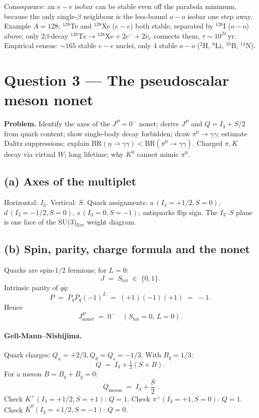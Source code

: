 \documentclass[11pt]{article}
\begin{document}
Consequence: an $e\!-\!e$ isobar can be stable even off the parabola minimum, because the only single-$\beta$ neighbour is the less-bound $o\!-\!o$ isobar one step away. Example $A=128$: $^{128}$Te and $^{128}$Xe ($e\!-\!e$) both stable, separated by $^{128}$I ($o\!-\!o$) above; only $2\beta$-decay $^{128}\text{Te}\to{}^{128}\text{Xe}+2e^{-}+2\bar\nu_{e}$ connects them, $\tau\sim 10^{24}\,$yr. Empirical census: $\sim 165$ stable $e\!-\!e$ nuclei, only 4 stable $o\!-\!o$ ($^{2}$H, $^{6}$Li, $^{10}$B, $^{14}$N).

\section*{Question 3 --- The pseudoscalar meson nonet}

\textbf{Problem.} Identify the axes of the $J^{P}=0^{-}$ nonet; derive $J^{P}$ and $Q=I_{3}+S/2$ from quark content; show single-body decay forbidden; draw $\pi^{0}\to\gamma\gamma$; estimate Dalitz suppressions; explain BR$(\eta\to\gamma\gamma)<$BR$(\pi^{0}\to\gamma\gamma)$. Charged $\pi,K$ decay via virtual $W$; long lifetime; why $K^{0}$ cannot mimic $\pi^{0}$.

\subsection*{(a) Axes of the multiplet}

Horizontal: $I_{3}$. Vertical: $S$. Quark assignments: $u\,(I_{3}{=}{+}1/2,S{=}0)$, $d\,(I_{3}{=}{-}1/2,S{=}0)$, $s\,(I_{3}{=}0,S{=}{-}1)$; antiquarks flip sign. The $I_{3}$--$S$ plane is one face of the SU(3)$_\text{flav}$ weight diagram.

\subsection*{(b) Spin, parity, charge formula and the nonet}

Quarks are spin-$1/2$ fermions; for $L=0$:
\[
J\;=\;S_\text{tot}\;\in\;\{0,1\}.
\]
Intrinsic parity of $q\bar q$:
\[
P\;=\;P_{q}P_{\bar q}(-1)^{L}\;=\;(+1)(-1)(+1)\;=\;-1.
\]
Hence
\begin{equation}
J^{P}_\text{nonet}\;=\;0^{-}\quad(S_\text{tot}=0,\,L=0).
\label{eq:JP}
\end{equation}

\paragraph{Gell-Mann--Nishijima.} Quark charges: $Q_{u}=+2/3,Q_{d}=Q_{s}=-1/3$. With $B_{q}=1/3$:
\[
Q\;=\;I_{3}+\tfrac{1}{2}(S+B).
\]
For a meson $B=B_{q}+B_{\bar q}=0$:
\begin{equation}
\boxed{\;Q_\text{meson}\;=\;I_{3}+\frac{S}{2}\;.}
\label{eq:Q-meson}
\end{equation}
Check $K^{+}(I_{3}={+}1/2,S={+}1)$: $Q=1$. Check $\pi^{+}(I_{3}={+}1,S=0)$: $Q=1$. Check $\bar K^{0}(I_{3}={+}1/2,S={-}1)$: $Q=0$.
\end{document}
